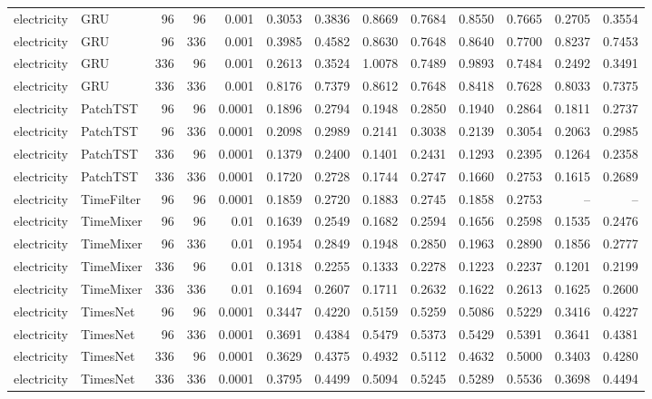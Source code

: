 \begin{longtable}{@{}llrrr*{8}{r}@{}}
electricity & GRU & 96 & 96 & 0.001 & 0.3053 & 0.3836 & 0.8669 & 0.7684 & 0.8550 & 0.7665 & 0.2705 & 0.3554 \\
electricity & GRU & 96 & 336 & 0.001 & 0.3985 & 0.4582 & 0.8630 & 0.7648 & 0.8640 & 0.7700 & 0.8237 & 0.7453 \\
electricity & GRU & 336 & 96 & 0.001 & 0.2613 & 0.3524 & 1.0078 & 0.7489 & 0.9893 & 0.7484 & 0.2492 & 0.3491 \\
electricity & GRU & 336 & 336 & 0.001 & 0.8176 & 0.7379 & 0.8612 & 0.7648 & 0.8418 & 0.7628 & 0.8033 & 0.7375 \\
electricity & PatchTST & 96 & 96 & 0.0001 & 0.1896 & 0.2794 & 0.1948 & 0.2850 & 0.1940 & 0.2864 & 0.1811 & 0.2737 \\
electricity & PatchTST & 96 & 336 & 0.0001 & 0.2098 & 0.2989 & 0.2141 & 0.3038 & 0.2139 & 0.3054 & 0.2063 & 0.2985 \\
electricity & PatchTST & 336 & 96 & 0.0001 & 0.1379 & 0.2400 & 0.1401 & 0.2431 & 0.1293 & 0.2395 & 0.1264 & 0.2358 \\
electricity & PatchTST & 336 & 336 & 0.0001 & 0.1720 & 0.2728 & 0.1744 & 0.2747 & 0.1660 & 0.2753 & 0.1615 & 0.2689 \\
electricity & TimeFilter & 96 & 96 & 0.0001 & 0.1859 & 0.2720 & 0.1883 & 0.2745 & 0.1858 & 0.2753 & -- & -- \\
electricity & TimeMixer & 96 & 96 & 0.01 & 0.1639 & 0.2549 & 0.1682 & 0.2594 & 0.1656 & 0.2598 & 0.1535 & 0.2476 \\
electricity & TimeMixer & 96 & 336 & 0.01 & 0.1954 & 0.2849 & 0.1948 & 0.2850 & 0.1963 & 0.2890 & 0.1856 & 0.2777 \\
electricity & TimeMixer & 336 & 96 & 0.01 & 0.1318 & 0.2255 & 0.1333 & 0.2278 & 0.1223 & 0.2237 & 0.1201 & 0.2199 \\
electricity & TimeMixer & 336 & 336 & 0.01 & 0.1694 & 0.2607 & 0.1711 & 0.2632 & 0.1622 & 0.2613 & 0.1625 & 0.2600 \\
electricity & TimesNet & 96 & 96 & 0.0001 & 0.3447 & 0.4220 & 0.5159 & 0.5259 & 0.5086 & 0.5229 & 0.3416 & 0.4227 \\
electricity & TimesNet & 96 & 336 & 0.0001 & 0.3691 & 0.4384 & 0.5479 & 0.5373 & 0.5429 & 0.5391 & 0.3641 & 0.4381 \\
electricity & TimesNet & 336 & 96 & 0.0001 & 0.3629 & 0.4375 & 0.4932 & 0.5112 & 0.4632 & 0.5000 & 0.3403 & 0.4280 \\
electricity & TimesNet & 336 & 336 & 0.0001 & 0.3795 & 0.4499 & 0.5094 & 0.5245 & 0.5289 & 0.5536 & 0.3698 & 0.4494 \\

\end{longtable}
